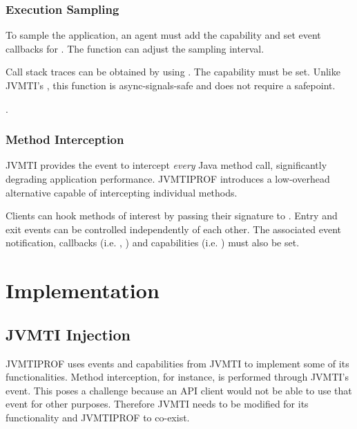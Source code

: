 \subsubsection*{Execution Sampling}

To sample the application, an agent must add the  capability and set event callbacks for . The  function can adjust the sampling interval.


Call stack traces can be obtained by using . The  capability must be set. Unlike JVMTI's , this function is async-signals-safe and does not require a safepoint.

.

\subsubsection*{Method Interception}

JVMTI provides the  event to intercept \emph{every} Java method call, significantly degrading application performance. JVMTIPROF introduces a low-overhead alternative capable of intercepting individual methods.

Clients can hook methods of interest by passing their signature to . Entry and exit events can be controlled independently of each other. The associated event notification, callbacks (i.e. , ) and capabilities (i.e. ) must also be set.

\section{Implementation} \label{sec:impl}

\subsection{JVMTI Injection}

JVMTIPROF uses events and capabilities from JVMTI to implement some of its functionalities. Method interception, for instance, is performed through JVMTI's  event. This poses a challenge because an API client would not be able to use that event for other purposes. Therefore JVMTI needs to be modified for its functionality and JVMTIPROF to co-exist.


